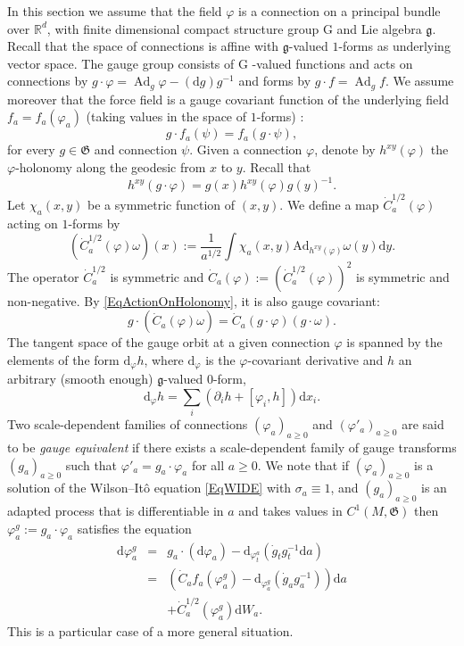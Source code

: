 \documentclass[reprint,aps]{revtex4-2}
\newcommand{\assign}{:=}
\newcommand{\cdummy}{\cdot}
\newcommand{\mathd}{\mathrm{d}}
\newcommand{\tmop}[1]{\ensuremath{\operatorname{#1}}}
\newcommand{\tmtextit}[1]{\textit{{{#1}}}}
\begin{document}
In this section we assume that the field $\varphi$ is a connection on a
principal bundle over $\mathbb{R}^d$, with finite dimensional compact
structure group  G  and Lie algebra $\mathfrak{g}$. Recall that the space of
connections is affine with $\mathfrak{g}$-valued $1$-forms as underlying
vector space. The gauge group $\mathfrak{}$consists of  G -valued functions
and acts on connections by $g \cdummy \varphi = \tmop{Ad}_g \varphi - (\mathd
g) g^{- 1}$ and forms by $g \cdummy f = \tmop{Ad}_g f$. We assume moreover
that the force field is a gauge covariant function of the underlying field
$f_a = f_a (\varphi_a)$ (taking values in the space of $1$-forms) :
\[ g \cdot f_a (\psi) = f_a  (g \cdot \psi), \]
for every $g \in \mathfrak{G}$ and connection $\psi$. Given a connection
$\varphi$, denote by $h^{xy} (\varphi)$ the $\varphi$-holonomy along the
geodesic from $x$ to $y$. Recall that
\begin{equation}
  \label{EqActionOnHolonomy} h^{xy}  (g \cdot \varphi) = g (x) h^{xy}
  (\varphi) g (y)^{- 1} .
\end{equation}
Let $\chi_a (x, y)$ be a symmetric function of $(x, y)$. We define a map
$\dot{C}_a^{1 / 2} (\varphi)$ acting on $1$-forms by
\[ (\dot{C}_a^{1 / 2} (\varphi) \omega) (x) \assign \frac{1}{a^{1 / 2}}  \int
   \chi_a (x, y) \mathrm{Ad}_{h^{xy} (\varphi)} \omega (y) \mathd y. \]
The operator $\dot{C}_a^{1 / 2}$ is symmetric and $\dot{C}_a (\varphi) \assign
(\dot{C}_a^{1 / 2} (\varphi))^2$ is symmetric and non-negative. By
\eqref{EqActionOnHolonomy}, it is also gauge covariant:
\[ g \cdot (\dot{C}_a (\varphi) \omega) = \dot{C}_a  (g \cdot \varphi)  (g
   \cdot \omega) . \]
The tangent space of the gauge orbit at a given connection $\varphi$ is
spanned by the elements of the form $\mathd_{\varphi} h$, where
$\mathd_{\varphi}$ is the $\varphi$-covariant derivative and $h$ an arbitrary
(smooth enough) $\mathfrak{g}$-valued $0$-form,
\[ \mathd_{\varphi} h = \sum_i (\partial_i h + [\varphi_i, h]) \mathd x_i . \]
Two scale-dependent families of connections $(\varphi_a)_{a \geqslant 0}$ and
$(\varphi'_a)_{a \geqslant 0}$ are said to be \tmtextit{gauge equivalent} if
there exists a scale-dependent family of gauge transforms $(g_a)_{a \geqslant
0}$ such that $\varphi'_a = g_a \cdot \varphi_a$ for all $a \geqslant 0$. We
note that if $(\varphi_a)_{a \geqslant 0}$ is a solution of the
Wilson--It{\^o} equation \eqref{EqWIDE} with $\sigma_a \equiv 1$, and
$(g_a)_{a \geqslant 0}$ is an adapted process that is differentiable in $a$
and takes values in $C^1 (M, \mathfrak{G})$ then $\varphi^g_a \assign g_a
\cdot \varphi_a$ satisfies the equation
\begin{equation}
  \label{EqGaugedDynamics} \begin{array}{lll}
    \mathd \varphi^g_a & = & g_a \cdummy (\mathd \varphi_a) -
    \mathd_{\varphi_t^a} (\dot{g}_t g_t^{- 1} \mathd a)\\
    & = & (\dot{C}_a f_a (\varphi^g_a) - \mathd_{\varphi_a^g} (\dot{g}_a g^{-
    1}_a)) \mathd a\\
    &  & + \dot{C}_a^{1 / 2} (\varphi^g_a) \mathd W_a .
  \end{array}
\end{equation}
This is a particular case of a more general situation.
\end{document}
